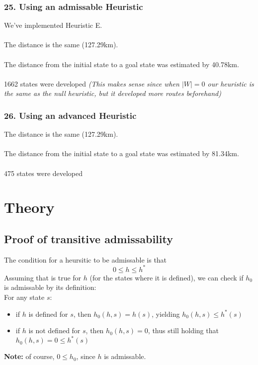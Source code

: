 \documentclass{article}
\begin{document}
\subsubsection*{25. Using an admissable Heuristic}
We've implemented Heuristic E. \\~\\
The distance is the same (127.29km). \\~\\
The distance from the initial state to a goal state was estimated by 40.78km. \\~\\
1662 states were developed \emph{(This makes sense since when $|W| = 0$ our heuristic is the same as the null heuristic, but it developed more routes beforehand)}

\subsubsection*{26. Using an advanced Heuristic}
The distance is the same (127.29km). \\~\\
The distance from the initial state to a goal state was estimated by 81.34km. \\~\\
475 states were developed


\section*{Theory}
\subsection*{Proof of transitive admissability}
The condition for a heursitic to be admissable is that 
$$ 0 \leq h \leq h^* $$
Assuming that is true for $h$ (for the states where it is defined), we can check if $h_0$ is admissable by its definition: \\ 
For any state $s$:
\begin{itemize}
\item if $h$ is defined for $s$, then $h_0(h,s) = h(s)$, yielding $h_0(h,s) \leq h^*(s) $
\item if $h$ is not defined for $s$, then $h_0(h,s) = 0$, thus still holding that $  h_0(h,s) = 0 \leq h^*(s) $
\end{itemize}

\textbf{Note: } of course, $0 \leq h_0$, since $h$ is admissable. \\ \\
\end{document}
